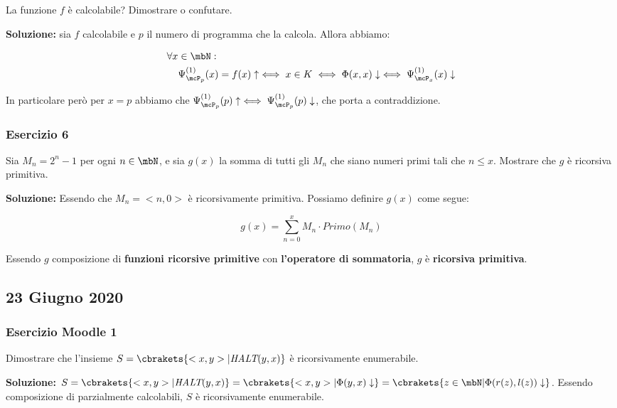 La funzione \(f\) è calcolabile? Dimostrare o confutare.

\textbf{Soluzione: } sia \(f\) calcolabile e \(p\) il numero di programma che la calcola. Allora abbiamo:

\begin{equation}
  \begin{split}
    \forall x &\in \mbN:\\
    &\Psi_{\mcP_p}^{(1)}(x) = f(x) \uparrow \iff x \in K \iff \Phi(x,x) \downarrow \iff \Psi_{\mcP_x}^{(1)}(x) \downarrow
  \end{split}
\end{equation}

In particolare però per \(x=p\) abbiamo che \(\Psi_{\mcP_p}^{(1)}(p) \uparrow \iff \Psi_{\mcP_p}^{(1)}(p)  \downarrow\), che porta a contraddizione.

\subsubsection{Esercizio 6}

Sia \(M_n=2^n -1\) per ogni \(n \in \mbN\), e sia \(g(x)\) la somma di tutti gli \(M_n\) che siano numeri primi tali che \(n \leq x\). Mostrare che \(g\) è ricorsiva primitiva.

\textbf{Soluzione: } Essendo che \(M_n=<n,0>\) è ricorsivamente primitiva. Possiamo definire \(g(x)\) come segue:

\begin{equation}
  g(x) = \sum_{n=0}^{x} M_n \cdot Primo(M_n)
\end{equation}

Essendo \(g\) composizione di \textbf{funzioni ricorsive primitive} con \textbf{l'operatore di sommatoria}, \(g\) è \textbf{ricorsiva primitiva}.

\subsection{23 Giugno 2020}

\subsubsection{Esercizio Moodle 1}

Dimostrare che l'insieme \(S=\cbrakets{<x,y> \vert \textit{HALT}(y,x)}\) è ricorsivamente enumerabile.

\textbf{Soluzione: } \(S=\cbrakets{<x,y> \vert \textit{HALT}(y,x)}=\cbrakets{<x,y> \vert \Phi(y,x) \downarrow}= \cbrakets{z \in \mbN \vert \Phi(r(z), l(z)) \downarrow}\). Essendo composizione di parzialmente calcolabili, \(S\) è ricorsivamente enumerabile.

